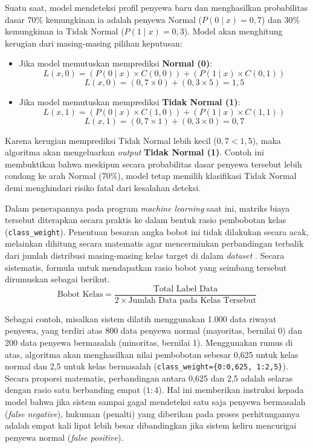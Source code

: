 Suatu saat, model mendeteksi profil penyewa baru dan menghasilkan probabilitas dasar 70\% kemungkinan ia adalah penyewa Normal ($P(0 \mid x) = 0{,}7$) dan 30\% kemungkinan ia Tidak Normal ($P(1 \mid x) = 0{,}3$).
Model akan menghitung kerugian dari masing-masing pilihan keputusan:
\begin{itemize}
    \item Jika model memutuskan memprediksi \textbf{Normal (0)}:
    $$
    L(x, 0) = (P(0 \mid x) \times C(0, 0)) + (P(1 \mid x) \times C(0, 1))
    $$
    $$
    L(x, 0) = (0{,}7 \times 0) + (0{,}3 \times 5) = 1{,}5
    $$
    
    \item Jika model memutuskan memprediksi \textbf{Tidak Normal (1)}:
    $$
    L(x, 1) = (P(0 \mid x) \times C(1, 0)) + (P(1 \mid x) \times C(1, 1))
    $$
    $$
    L(x, 1) = (0{,}7 \times 1) + (0{,}3 \times 0) = 0{,}7
    $$
\end{itemize}

Karena kerugian memprediksi Tidak Normal lebih kecil ($0{,}7 < 1{,}5$), maka algoritma akan mengeluarkan \textit{output} \textbf{Tidak Normal (1)}. Contoh ini membuktikan bahwa meskipun secara probabilitas dasar penyewa tersebut lebih condong ke arah Normal (70\%), model tetap memilih klasifikasi Tidak Normal demi menghindari risiko fatal dari kesalahan deteksi. 

Dalam penerapannya pada program \textit{machine learning} saat ini, matriks biaya tersebut diterapkan secara praktis ke dalam bentuk rasio pembobotan kelas (\texttt{class\_weight}). Penentuan besaran angka bobot ini tidak dilakukan secara acak, melainkan dihitung secara matematis agar mencerminkan perbandingan terbalik dari jumlah distribusi masing-masing kelas target di dalam \textit{dataset} \cite{sun2009classification}. Secara sistematis, formula untuk mendapatkan rasio bobot yang seimbang tersebut dirumuskan sebagai berikut.
$$
\text{Bobot Kelas} = \frac{\text{Total Label Data}}{2 \times \text{Jumlah Data pada Kelas Tersebut}}
$$

Sebagai contoh, misalkan sistem dilatih menggunakan 1.000 data riwayat penyewa, yang terdiri atas 800 data penyewa normal (mayoritas, bernilai 0) dan 200 data penyewa bermasalah (minoritas, bernilai 1). Menggunakan rumus di atas, algoritma akan menghasilkan nilai pembobotan sebesar 0,625 untuk kelas normal dan 2,5 untuk kelas bermasalah (\texttt{class\_weight=\{0:0{,}625, 1:2{,}5\}}). Secara proporsi matematis, perbandingan antara 0,625 dan 2,5 adalah selaras dengan rasio satu berbanding empat ($1:4$). Hal ini memberikan instruksi kepada model bahwa jika sistem sampai gagal mendeteksi satu saja penyewa bermasalah (\textit{false negative}), hukuman (penalti) yang diberikan pada proses perhitungannya adalah empat kali lipat lebih besar dibandingkan jika sistem keliru mencurigai penyewa normal (\textit{false positive}).

